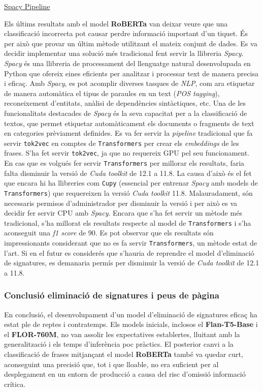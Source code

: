 \underline{Spacy Pipeline}

Els últims resultats amb el model \textbf{RoBERTa} van deixar veure que una classificació incorrecta pot causar perdre informació important d'un tiquet. És per això que provar un últim mètode utilitzant el mateix conjunt de dades. Es va decidir implementar una solució més tradicional fent servir la llibreria \textit{Spacy}.
\textit{Spacy} és una llibreria de processament del llenguatge natural desenvolupada en Python que ofereix eines eficients per analitzar i processar text de manera precisa i eficaç. Amb \textit{Spacy}, es pot acomplir diverses tasques de \textit{NLP}, com ara etiquetar de manera automàtica el tipus de paraules en un text (\textit{POS tagging}), reconeixement d'entitats, anàlisi de dependències sintàctiques, etc. Una de les funcionalitats destacades de \textit{Spacy} és la seva capacitat per a la classificació de textos, que permet etiquetar automàticament els documents o fragments de text en categories prèviament definides.
Es va fer servir la \textit{pipeline} tradicional que fa servir \texttt{tok2vec} en comptes de \texttt{Transformers} per crear els \textit{embeddings} de les frases. S'ha fet servir \texttt{tok2vec}, ja que no requereix GPU pel seu funcionament. En cas que es volgués fer servir \texttt{Transformers} per millorar els resultats, faria falta disminuir la versió de \textit{Cuda toolkit} de 12.1 a 11.8. La causa d'això és el fet que encara hi ha llibreries com \texttt{Cupy} (essencial per entrenar \textit{Spacy} amb models de \texttt{Transformers}) que requereixen la versió \textit{Cuda toolkit} 11.8. Malauradament, són necessaris permisos d'administrador per disminuir la versió i per això es va decidir fer servir CPU amb \textit{Spacy}.
Encara que s'ha fet servir un mètode més tradicional, s'ha millorat els resultats respecte al model de \texttt{Transformers} i s'ha aconseguit una \textit{f1 score} de 90. Es pot observar que els resultats són impressionants considerant que no es fa servir \texttt{Transformers}, un mètode estat de l'art. Si en el futur es considerés que s'hauria de reprendre el model d'eliminació de signatures, es demanaria permís per disminuir la versió de \textit{Cuda toolkit} de 12.1 a 11.8.

\subsubsection{Conclusió eliminació de signatures i peus de pàgina}
En conclusió, el desenvolupament d'un model d'eliminació de signatures eficaç ha estat ple de reptes i contratemps. Els models inicials, inclosos el \textbf{Flan-T5-Base} i el \textbf{FLOR-760M}, no van assolir les expectatives establertes, lluitant amb la generalització i els temps d'inferència poc pràctics. El posterior canvi a la classificació de frases mitjançant el model \textbf{RoBERTa} també va quedar curt, aconseguint una precisió que, tot i que lloable, no era suficient per al desplegament en un entorn de producció a causa del risc d'omissió informació crítica.

